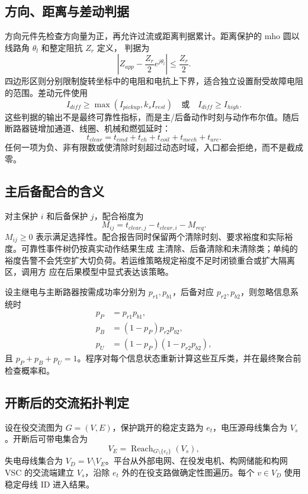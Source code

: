 \subsection{方向、距离与差动判据}
方向元件先检查方向量为正，再允许过流或距离判据累计。距离保护的 mho 圆以线路角 $\theta_l$ 和整定阻抗 $Z_r$ 定义，
判据为
\begin{equation}
 \left|Z_{app}-\frac{Z_r}{2}e^{j\theta_l}\right|
 \le\frac{Z_r}{2}.
\end{equation}
四边形区则分别限制旋转坐标中的电阻和电抗上下界，适合独立设置耐受故障电阻的范围。差动元件使用
\begin{equation}
 I_{diff}\ge\max(I_{pickup},k_s I_{rest})
 \quad\text{或}\quad I_{diff}\ge I_{high}.
\end{equation}
这些判据的输出不是最终可靠性指标，而是主/后备动作时刻与动作布尔值。随后断路器链增加通道、线圈、机械和燃弧延时：
\begin{equation}\label{eq:rel-breaker-chain}
 t_{clear}=t_{cmd}+t_{ch}+t_{coil}+t_{mech}+t_{arc}.
\end{equation}
任何一项为负、非有限数或使清除时刻超过动态时域，入口都会拒绝，而不是截成零。

\subsection{主后备配合的含义}
对主保护 $i$ 和后备保护 $j$，配合裕度为
\begin{equation}
 M_{ij}=t_{clear,j}-t_{clear,i}-M_{req}.
\end{equation}
$M_{ij}\ge0$ 表示满足选择性。配合报告同时保留两个清除时刻、要求裕度和实际裕度。可靠性事件树仍按真实动作结果生成
主清除、后备清除和未清除类；单纯的裕度告警不会凭空扩大切负荷。若运维策略规定裕度不足时闭锁重合或扩大隔离区，调用方
应在后果模型中显式表达该策略。

设主继电与主断路器按需成功率分别为 $p_{r1},p_{b1}$，后备对应 $p_{r2},p_{b2}$，则忽略信息系统时
\begin{align}
 p_P&=p_{r1}p_{b1},\\
 p_B&=(1-p_P)p_{r2}p_{b2},\\
 p_U&=(1-p_P)(1-p_{r2}p_{b2}),
\end{align}
且 $p_P+p_B+p_U=1$。程序对每个信息状态重新计算这些互斥类，并在最终聚合前检查概率和。

\subsection{开断后的交流拓扑判定}
设在役交流图为 $G=(V,E)$，保护跳开的稳定支路为 $e_t$，电压源母线集合为 $V_s$。开断后可带电集合为
\begin{equation}
 V_E=\operatorname{Reach}_{G\setminus\{e_t\}}(V_s),
\end{equation}
失电母线集合为 $V_D=V\setminus V_E$。平台从外部电网、在役发电机、构网储能和构网 VSC 的交流端建立 $V_s$，沿除
$e_t$ 外的在役支路做确定性图遍历。每个 $v\in V_D$ 使用稳定母线 ID 进入结果。

